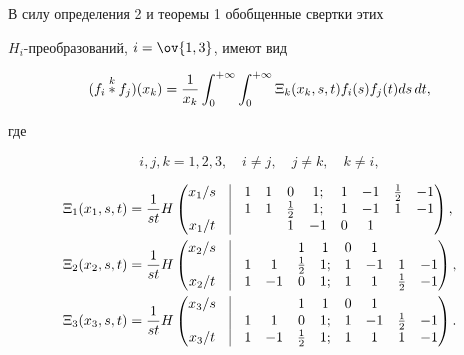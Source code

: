 В силу определения 2 и теоремы 1 обобщенные свертки этих 


$H_i$-преобразований, $i=\ov{1,3}$, имеют вид 


$$ 


(f_i\up{k}{*}f_j)(x_k)=\frac{1}{x_k} 


\int^{+\infty}_0\int^{+\infty}_0 


\Xi_k(x_k,s,t)f_i(s)f_j(t)ds\,dt, 


$$ 


где \label{kernels} 


$$ 


i,j,k=1,2,3,\quad i\ne j,\quad j\ne k,\quad k\ne i, 


$$ 


\begin{align*} 


\Xi_1(x_1,s,t)&=\frac{1}{s t}H 


\begin{pmatrix} 


x_1/s & \vline & 1 & 1 & 0 & 1; & 1 & -1 & \frac{1}{2} & -1 \\ 


\ & \vline & 1 & 1 & \frac{1}{2} & 1; & 1 & -1 & 1 & -1 \\ 


x_1/t & \vline & \ & \ & 1 & -1 & 0 & 1 & \ & \ 


\end{pmatrix} 


, \\ 


% 


\Xi_2(x_2,s,t)&=\frac{1}{s t}H 


\begin{pmatrix} 


x_2/s & \vline & \ & \ & 1 & 1 & 0 & 1 & \ & \ \\ 


\ & \vline & 1 & 1 & \frac{1}{2} & 1; & 1 & -1 & 1 & -1 \\ 


x_2/t & \vline & 1 & -1 & 0 & 1; & 1 & 1 & \frac{1}{2} & -1 


\end{pmatrix} 


, \\ 


% 


\Xi_3(x_3,s,t)&=\frac{1}{s t}H 


\begin{pmatrix} 


x_3/s & \vline & \ & \ & 1 & 1 & 0 & 1 & \ & \ \\ 


\ & \vline & 1 & 1 & 0 & 1; & 1 & -1 & \frac{1}{2} & -1 \\ 


x_3/t & \vline & 1 & -1 & \frac{1}{2} & 1; & 1 & 1 & 1 & -1 


\end{pmatrix} 


. 


\end{align*} 


